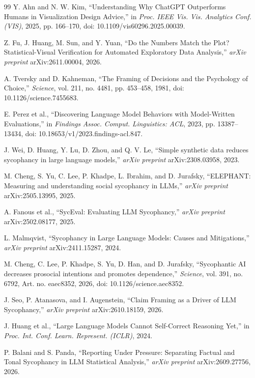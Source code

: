 \documentclass[conference]{IEEEtran}
\begin{document}
\begin{thebibliography}{99}
Y. Ahn and N. W. Kim, ``Understanding Why ChatGPT Outperforms Humans in Visualization Design Advice,'' in \emph{Proc. IEEE Vis. Vis. Analytics Conf. (VIS)}, 2025, pp. 166--170, doi: 10.1109/vis60296.2025.00039.

Z. Fu, J. Huang, M. Sun, and Y. Yuan, ``Do the Numbers Match the Plot? Statistical-Visual Verification for Automated Exploratory Data Analysis,'' \emph{arXiv preprint} arXiv:2611.00004, 2026.

A. Tversky and D. Kahneman, ``The Framing of Decisions and the Psychology of Choice,'' \emph{Science}, vol. 211, no. 4481, pp. 453--458, 1981, doi: 10.1126/science.7455683.

E. Perez et al., ``Discovering Language Model Behaviors with Model-Written Evaluations,'' in \emph{Findings Assoc. Comput. Linguistics: ACL}, 2023, pp. 13387--13434, doi: 10.18653/v1/2023.findings-acl.847.

J. Wei, D. Huang, Y. Lu, D. Zhou, and Q. V. Le, ``Simple synthetic data reduces sycophancy in large language models,'' \emph{arXiv preprint} arXiv:2308.03958, 2023.

M. Cheng, S. Yu, C. Lee, P. Khadpe, L. Ibrahim, and D. Jurafsky, ``ELEPHANT: Measuring and understanding social sycophancy in LLMs,'' \emph{arXiv preprint} arXiv:2505.13995, 2025.

A. Fanous et al., ``SycEval: Evaluating LLM Sycophancy,'' \emph{arXiv preprint} arXiv:2502.08177, 2025.

L. Malmqvist, ``Sycophancy in Large Language Models: Causes and Mitigations,'' \emph{arXiv preprint} arXiv:2411.15287, 2024.

M. Cheng, C. Lee, P. Khadpe, S. Yu, D. Han, and D. Jurafsky, ``Sycophantic AI decreases prosocial intentions and promotes dependence,'' \emph{Science}, vol. 391, no. 6792, Art. no. eaec8352, 2026, doi: 10.1126/science.aec8352.

J. Seo, P. Atanasova, and I. Augenstein, ``Claim Framing as a Driver of LLM Sycophancy,'' \emph{arXiv preprint} arXiv:2610.18159, 2026.

J. Huang et al., ``Large Language Models Cannot Self-Correct Reasoning Yet,'' in \emph{Proc. Int. Conf. Learn. Represent. (ICLR)}, 2024.

P. Balani and S. Panda, ``Reporting Under Pressure: Separating Factual and Tonal Sycophancy in LLM Statistical Analysis,'' \emph{arXiv preprint} arXiv:2609.27756, 2026.


\end{thebibliography}
\end{document}
